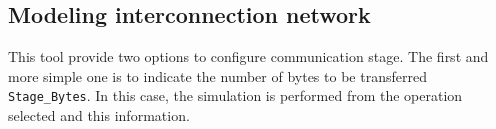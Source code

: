 \subsection{Modeling interconnection network}
This tool provide two options to configure communication stage.
The first and more simple one is to indicate the number of bytes to be transferred \texttt{Stage\_Bytes}. In this case, the simulation is performed from the operation selected and this information.





